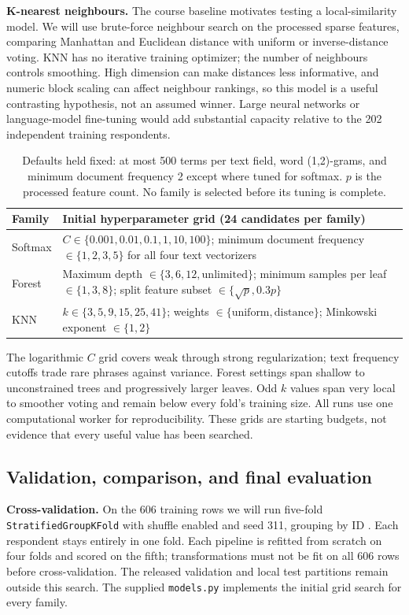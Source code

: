 \documentclass[12pt]{article}
\begin{document}
\textbf{K-nearest neighbours.}
The course baseline motivates testing a local-similarity model. We will use
brute-force neighbour search on the processed sparse features, comparing Manhattan
and Euclidean distance with uniform or inverse-distance voting. KNN has no
iterative training optimizer; the number of neighbours controls smoothing.
High dimension can make distances less informative, and numeric block scaling
can affect neighbour rankings, so this model is a useful contrasting hypothesis,
not an assumed winner. Large neural networks or language-model fine-tuning would
add substantial capacity relative to the 202 independent training respondents.

\begin{table}[h!]
\centering\small
\begin{tabular}{@{}p{.83in}p{5.45in}@{}}
\toprule
Family & Initial hyperparameter grid (24 candidates per family)\\
\midrule
Softmax & $C\in\{0.001,0.01,0.1,1,10,100\}$; minimum document frequency
$\in\{1,2,3,5\}$ for all four text vectorizers\\[4pt]
Forest & Maximum depth $\in\{3,6,12,\text{unlimited}\}$; minimum samples per leaf
$\in\{1,3,8\}$; split feature subset $\in\{\sqrt{p},0.3p\}$\\[4pt]
KNN & $k\in\{3,5,9,15,25,41\}$; weights $\in\{\text{uniform},\text{distance}\}$;
Minkowski exponent $\in\{1,2\}$\\
\bottomrule
\end{tabular}
\caption{Defaults held fixed: at most 500 terms per text field, word (1,2)-grams,
and minimum document frequency 2 except where tuned for softmax. $p$ is the
processed feature count. No family is selected before its tuning is complete.}
\end{table}

The logarithmic $C$ grid covers weak through strong regularization; text frequency
cutoffs trade rare phrases against variance. Forest settings span shallow to
unconstrained trees and progressively larger leaves. Odd $k$ values span very
local to smoother voting and remain below every fold's training size. All runs
use one computational worker for reproducibility. These grids are starting
budgets, not evidence that every useful value has been searched.

\clearpage
\subsection*{Validation, comparison, and final evaluation}
\textbf{Cross-validation.}
On the 606 training rows we will run five-fold
\texttt{StratifiedGroupKFold} with shuffle enabled and seed 311, grouping by ID
\cite{sklearngroups}. Each respondent stays entirely in one fold. Each pipeline
is refitted from scratch on four folds and scored on the fifth; transformations
must not be fit on all 606 rows before cross-validation. The released validation
and local test partitions remain outside this search. The supplied
\texttt{models.py} implements the initial grid search for every family.
\end{document}
